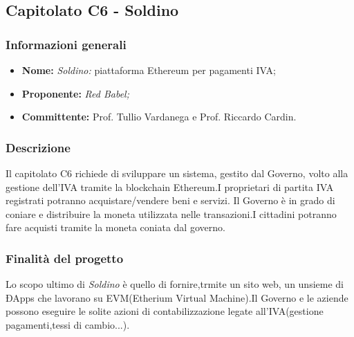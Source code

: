 \subsection{Capitolato C6 - Soldino}

\subsubsection{Informazioni generali}
\begin{itemize}
	\item \textbf {Nome:} \textit{Soldino:} piattaforma Ethereum per pagamenti IVA;
	\item \textbf {Proponente:} \textit{Red Babel;}
	\item \textbf {Committente:} Prof. Tullio Vardanega e Prof. Riccardo Cardin.
\end{itemize}

\subsubsection{Descrizione}
Il capitolato C6 richiede di sviluppare un sistema, gestito dal Governo, volto alla gestione dell'IVA tramite la blockchain Ethereum.I proprietari di partita IVA registrati potranno acquistare/vendere beni e servizi.
Il Governo è in grado di coniare e distribuire la moneta utilizzata nelle transazioni.I cittadini potranno fare acquisti tramite la moneta coniata dal governo.   

\subsubsection{Finalità del progetto}
Lo scopo ultimo di \textit{Soldino} è quello di fornire,trmite un sito web, un unsieme di ÐApps che lavorano su EVM(Etherium Virtual Machine).Il Governo e le aziende possono eseguire le solite azioni di contabilizzazione legate all'IVA(gestione pagamenti,tessi di cambio...).  
